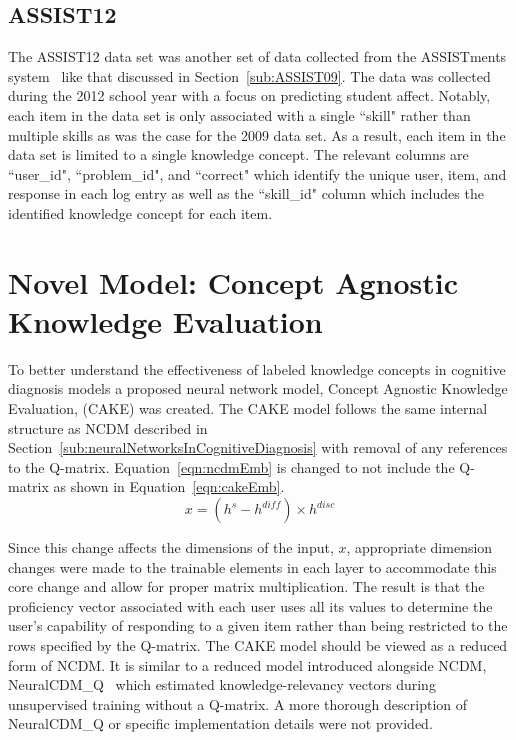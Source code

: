 \documentclass[letterpaper, 12pt, captions=tableabove]{scrreprt}
\begin{document}
		\subsection{ASSIST12}
		\label{sub:ASSIST12}
			The ASSIST12 data set was another set of data collected from the ASSISTments system~\cite{feng2009} like that discussed in Section~\ref{sub:ASSIST09}. The data was collected during the 2012 school year with a focus on predicting student affect.   Notably, each item in the data set is only associated with a single ``skill" rather than multiple skills as was the case for the 2009 data set. As a result, each item in the data set is limited to a single knowledge concept. The relevant columns are ``user\_id", ``problem\_id", and ``correct" which identify the unique user, item, and response in each log entry as well as the ``skill\_id" column which includes the identified knowledge concept for each item.

	\section{Novel Model: Concept Agnostic Knowledge Evaluation}
	\label{sec:CAKE}
		To better understand the effectiveness of labeled knowledge concepts in cognitive diagnosis models a proposed neural network model, Concept Agnostic Knowledge Evaluation, (CAKE) was created. The CAKE model follows the same internal structure as NCDM described in Section~\ref{sub:neuralNetworksInCognitiveDiagnosis} with  removal of any references to the Q-matrix. Equation~\ref{eqn:ncdmEmb} is changed to not include the Q-matrix as shown in Equation~\ref{eqn:cakeEmb}. 
\begin{equation}
	\label{eqn:cakeEmb}
	x= (h^s-h^{diff})\times h^{disc}
\end{equation}

		Since this change affects the dimensions of the input, $x$, appropriate dimension changes were made to the trainable elements in each layer to accommodate this core change and allow for proper matrix multiplication. The result is that the proficiency vector associated with each user uses all its values to determine the user's capability of responding to a given item rather than being restricted to the rows specified by the Q-matrix. The CAKE model should be viewed as a reduced form of NCDM. It is similar to a reduced model introduced alongside NCDM, NeuralCDM\_Q~\cite{wang2022} which estimated knowledge-relevancy vectors during unsupervised training without a Q-matrix. A more thorough description of NeuralCDM\_Q or specific implementation details were not provided.  
\end{document}
